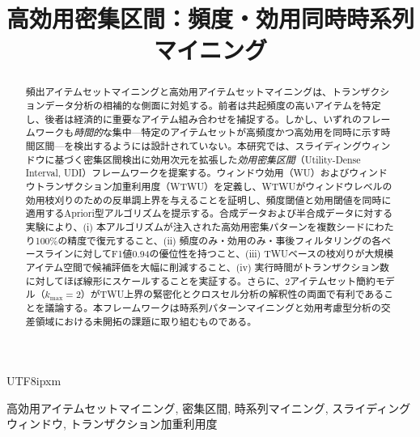 \documentclass[journal]{IEEEtran}
\begin{document}
\begin{CJK}{UTF8}{ipxm}

\title{高効用密集区間：頻度・効用同時時系列マイニング}

\author{
}

\maketitle

\begin{abstract}
頻出アイテムセットマイニングと高効用アイテムセットマイニングは、トランザクションデータ分析の相補的な側面に対処する。前者は共起頻度の高いアイテムを特定し、後者は経済的に重要なアイテム組み合わせを捕捉する。しかし、いずれのフレームワークも\emph{時間的}な集中---特定のアイテムセットが高頻度かつ高効用を同時に示す時間区間---を検出するようには設計されていない。本研究では、スライディングウィンドウに基づく密集区間検出に効用次元を拡張した\emph{効用密集区間}（Utility-Dense Interval, UDI）フレームワークを提案する。ウィンドウ効用（WU）およびウィンドウトランザクション加重利用度（WTWU）を定義し、WTWUがウィンドウレベルの効用枝刈りのための反単調上界を与えることを証明し、頻度閾値と効用閾値を同時に適用するApriori型アルゴリズムを提示する。合成データおよび半合成データに対する実験により、(i) 本アルゴリズムが注入された高効用密集パターンを複数シードにわたり100\%の精度で復元すること、(ii) 頻度のみ・効用のみ・事後フィルタリングの各ベースラインに対してF1値0.94の優位性を持つこと、(iii) TWUベースの枝刈りが大規模アイテム空間で候補評価を大幅に削減すること、(iv) 実行時間がトランザクション数に対してほぼ線形にスケールすることを実証する。さらに、2アイテムセット簡約モデル（$k_{\max} = 2$）がTWU上界の緊密化とクロスセル分析の解釈性の両面で有利であることを議論する。本フレームワークは時系列パターンマイニングと効用考慮型分析の交差領域における未開拓の課題に取り組むものである。
\end{abstract}

\begin{IEEEkeywords}
高効用アイテムセットマイニング, 密集区間, 時系列マイニング, スライディングウィンドウ, トランザクション加重利用度
\end{IEEEkeywords}











\end{CJK}
\end{document}
